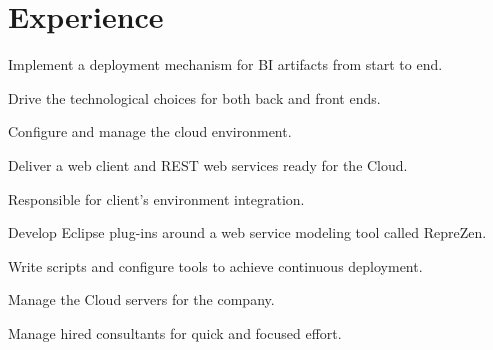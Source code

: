 \documentclass[letterpaper]{deedy-resume} %
\begin{document}
\begin{minipage}[t]{0.66\textwidth} %


\section{Experience}


\vspace{\topsep} %
\begin{tightitemize}
\item Implement a deployment mechanism for BI artifacts from start to end.
\item Drive the technological choices for both back and front ends.
\item Configure and manage the cloud environment.
\item Deliver a web client and REST web services ready for the Cloud.
\end{tightitemize}

\sectionspace %



\begin{tightitemize}
\item Responsible for client's environment integration.
\item Develop Eclipse plug-ins around a web service modeling tool called RepreZen.
\item Write scripts and configure tools to achieve continuous deployment.
\item Manage the Cloud servers for the company.
\item Manage hired consultants for quick and focused effort.
\end{tightitemize}

\sectionspace %



\end{minipage}
\end{document}
